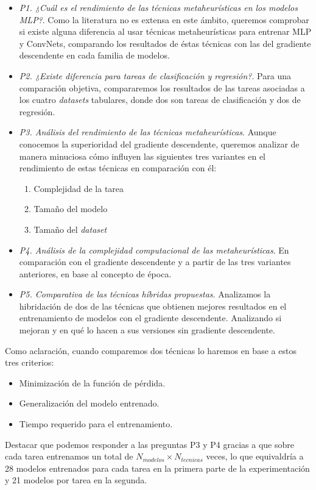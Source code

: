 \begin{itemize}

\item \textit{P1. ¿Cuál es el rendimiento de las técnicas metaheurísticas en los modelos MLP?}. Como la literatura no es extensa en este ámbito, queremos comprobar si existe alguna diferencia al usar técnicas metaheurísticas para entrenar MLP y ConvNets, comparando los resultados de éstas técnicas con las del gradiente descendente en cada familia de modelos.

\item \textit{P2. ¿Existe diferencia para tareas de clasificación y regresión?}. Para una comparación objetiva, compararemos los resultados de las tareas asociadas a los cuatro \textit{datasets} tabulares, donde dos son tareas de clasificación y dos de regresión.

\item \textit{P3. Análisis del rendimiento de las técnicas metaheurísticas}. Aunque conocemos la superioridad del gradiente descendente, queremos analizar de manera minuciosa cómo influyen las siguientes tres variantes en el rendimiento de estas técnicas en comparación con él:
	
	\begin{enumerate}
		\item Complejidad de la tarea
		
		\item Tamaño del modelo
		
		\item Tamaño del \textit{dataset}
	\end{enumerate}

\item \textit{P4. Análisis de la complejidad computacional de las metaheurísticas}. En comparación con el gradiente descendente y a partir de las tres variantes anteriores, en base al concepto de época.

\item \textit{P5. Comparativa de las técnicas híbridas propuestas}. Analizamos la hibridación de dos de las técnicas que obtienen mejores resultados en el entrenamiento de modelos con el gradiente descendente. Analizando si mejoran y en qué lo hacen a sus versiones sin gradiente descendente.

\end{itemize}

Como aclaración, cuando comparemos dos técnicas lo haremos en base a estos tres criterios:

\begin{itemize}
	\item Minimización de la función de pérdida.
	
	\item Generalización del modelo entrenado.
	
	\item Tiempo requerido para el entrenamiento.
\end{itemize}	
	
Destacar que podemos responder a las preguntas P3 y P4 gracias a que sobre cada tarea entrenamos un total de $N_{modelos} \times N_{tecnicas}$ veces, lo que equivaldría a 28 modelos entrenados para cada tarea en la primera parte de la experimentación y 21 modelos por tarea en la segunda.
